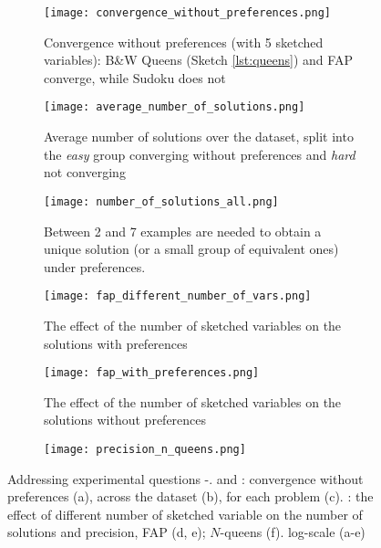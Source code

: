 \begin{figure}[!thb]
  \centering
  \begin{subfigure}[t]{0.49\textwidth}
    \texttt{[image: convergence\_without\_preferences.png]}
    \caption{Convergence without preferences (with 5 sketched variables): B\&W Queens (Sketch \ref{lst:queens}) and FAP converge, while Sudoku does not}
    \label{fig:convergence_without_preferences}
  \end{subfigure}
  \hfill
  \begin{subfigure}[t]{0.49\textwidth}
    \texttt{[image: average\_number\_of\_solutions.png]}
    \caption{Average number of solutions over the dataset, split into the \textit{easy} group converging without preferences and \textit{hard} not converging }
    \label{fig:preferences_effect}
  \end{subfigure}
  \hfill
  \begin{subfigure}[t]{0.49\textwidth}
    \texttt{[image: number\_of\_solutions\_all.png]}
    \caption{Between 2 and 7 examples are needed to obtain a unique solution (or a small group of equivalent ones) under preferences.}
    \label{fig:number_of_solutions}
  \end{subfigure}
  \hfill
  \begin{subfigure}[t]{0.49\textwidth}
    \texttt{[image: fap\_different\_number\_of\_vars.png]}
    \caption{The effect of the number of sketched variables on the solutions with preferences}
    \label{fig:fap_with_preferences}
  \end{subfigure}
  \hfill
  \begin{subfigure}[t]{0.49\textwidth}
    \texttt{[image: fap\_with\_preferences.png]}
    \caption{The effect of the number of sketched variables on the solutions without preferences}
    \label{fig:fap_without_preferences}
  \end{subfigure}
  \hfill
  \begin{subfigure}[t]{0.49\textwidth}
    \texttt{[image: precision\_n\_queens.png]}
    \caption{}
    \label{fig:precision_n_queens}
  \end{subfigure}
  \caption{Addressing experimental questions \qone-\qthree. \qone and \qtwo: convergence without preferences (a), across the dataset (b), for each problem (c). \qthree: the effect of different number of sketched variable on the number of solutions and precision, FAP (d, e); $N$-queens (f). log-scale (a-e)}
\end{figure}

